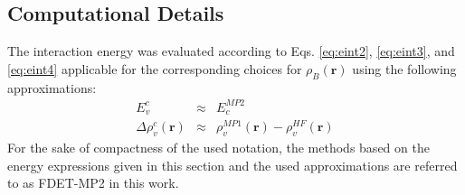 \documentclass[journal=jctcce,manuscript=article]{achemso}
\begin{document}
\subsection{Computational Details}
The interaction energy was evaluated according to Eqs. \ref{eq:eint2}, \ref{eq:eint3}, and \ref{eq:eint4} applicable for the corresponding choices for $\rho_B(\mathbf{r})$ using the following approximations:
\begin{eqnarray}
E^{c}_{v}&\approx&E_c^{MP2} \label{eq:appr_ec}\\
\Delta \rho^{c}_{v}(\mathbf{r})&\approx&\rho_v^{MP1}(\mathbf{r})-\rho_v^{HF}(\mathbf{r}) \label{eq:appr_rc}
\end{eqnarray}
For the sake of compactness of the used notation, the methods based on the energy expressions given in this section and the used approximations are referred to as FDET-MP2 in this work. 
\end{document}
